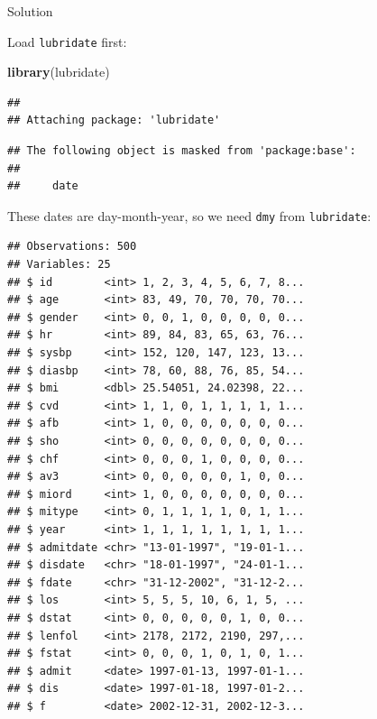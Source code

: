 \documentclass[]{tufte-book}
\newenvironment{Shaded}{}{}
\newcommand{\DataTypeTok}[1]{\textcolor[rgb]{0.56,0.13,0.00}{#1}}
\newcommand{\KeywordTok}[1]{\textcolor[rgb]{0.00,0.44,0.13}{\textbf{#1}}}
\newcommand{\NormalTok}[1]{#1}
\newcommand{\OperatorTok}[1]{\textcolor[rgb]{0.40,0.40,0.40}{#1}}
\newcommand{\StringTok}[1]{\textcolor[rgb]{0.25,0.44,0.63}{#1}}
\theoremstyle{definition}
\theoremstyle{definition}
\theoremstyle{definition}
\theoremstyle{remark}
\begin{document}
Solution

Load \texttt{lubridate} first:

\begin{Shaded}
\begin{Highlighting}[]
\KeywordTok{library}\NormalTok{(lubridate)}
\end{Highlighting}
\end{Shaded}

\begin{verbatim}
## 
## Attaching package: 'lubridate'
\end{verbatim}

\begin{verbatim}
## The following object is masked from 'package:base':
## 
##     date
\end{verbatim}

These dates are day-month-year, so we need \texttt{dmy} from
\texttt{lubridate}:

\begin{Shaded}
\end{Shaded}

\begin{verbatim}
## Observations: 500
## Variables: 25
## $ id        <int> 1, 2, 3, 4, 5, 6, 7, 8...
## $ age       <int> 83, 49, 70, 70, 70, 70...
## $ gender    <int> 0, 0, 1, 0, 0, 0, 0, 0...
## $ hr        <int> 89, 84, 83, 65, 63, 76...
## $ sysbp     <int> 152, 120, 147, 123, 13...
## $ diasbp    <int> 78, 60, 88, 76, 85, 54...
## $ bmi       <dbl> 25.54051, 24.02398, 22...
## $ cvd       <int> 1, 1, 0, 1, 1, 1, 1, 1...
## $ afb       <int> 1, 0, 0, 0, 0, 0, 0, 0...
## $ sho       <int> 0, 0, 0, 0, 0, 0, 0, 0...
## $ chf       <int> 0, 0, 0, 1, 0, 0, 0, 0...
## $ av3       <int> 0, 0, 0, 0, 0, 1, 0, 0...
## $ miord     <int> 1, 0, 0, 0, 0, 0, 0, 0...
## $ mitype    <int> 0, 1, 1, 1, 1, 0, 1, 1...
## $ year      <int> 1, 1, 1, 1, 1, 1, 1, 1...
## $ admitdate <chr> "13-01-1997", "19-01-1...
## $ disdate   <chr> "18-01-1997", "24-01-1...
## $ fdate     <chr> "31-12-2002", "31-12-2...
## $ los       <int> 5, 5, 5, 10, 6, 1, 5, ...
## $ dstat     <int> 0, 0, 0, 0, 0, 1, 0, 0...
## $ lenfol    <int> 2178, 2172, 2190, 297,...
## $ fstat     <int> 0, 0, 0, 1, 0, 1, 0, 1...
## $ admit     <date> 1997-01-13, 1997-01-1...
## $ dis       <date> 1997-01-18, 1997-01-2...
## $ f         <date> 2002-12-31, 2002-12-3...
\end{verbatim}
\end{document}
